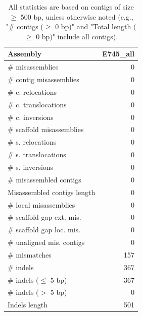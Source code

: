 \documentclass[12pt,a4paper]{article}
\begin{document}
\begin{table}[ht]
\begin{center}
\caption{All statistics are based on contigs of size $\geq$ 500 bp, unless otherwise noted (e.g., "\# contigs ($\geq$ 0 bp)" and "Total length ($\geq$ 0 bp)" include all contigs).}
\begin{tabular}{|l*{1}{|r}|}
\hline
Assembly & E745\_all \\ \hline
\# misassemblies & 0 \\ \hline
\hspace{2mm}\# contig misassemblies & 0 \\ \hline
\hspace{5mm}\# c. relocations & 0 \\ \hline
\hspace{5mm}\# c. translocations & 0 \\ \hline
\hspace{5mm}\# c. inversions & 0 \\ \hline
\hspace{2mm}\# scaffold misassemblies & 0 \\ \hline
\hspace{5mm}\# s. relocations & 0 \\ \hline
\hspace{5mm}\# s. translocations & 0 \\ \hline
\hspace{5mm}\# s. inversions & 0 \\ \hline
\# misassembled contigs & 0 \\ \hline
Misassembled contigs length & 0 \\ \hline
\# local misassemblies & 0 \\ \hline
\# scaffold gap ext. mis. & 0 \\ \hline
\# scaffold gap loc. mis. & 0 \\ \hline
\# unaligned mis. contigs & 0 \\ \hline
\# mismatches & 157 \\ \hline
\# indels & 367 \\ \hline
\hspace{5mm}\# indels ($\leq$ 5 bp) & 367 \\ \hline
\hspace{5mm}\# indels ($>$ 5 bp) & 0 \\ \hline
Indels length & 501 \\ \hline
\end{tabular}
\end{center}
\end{table}
\end{document}
